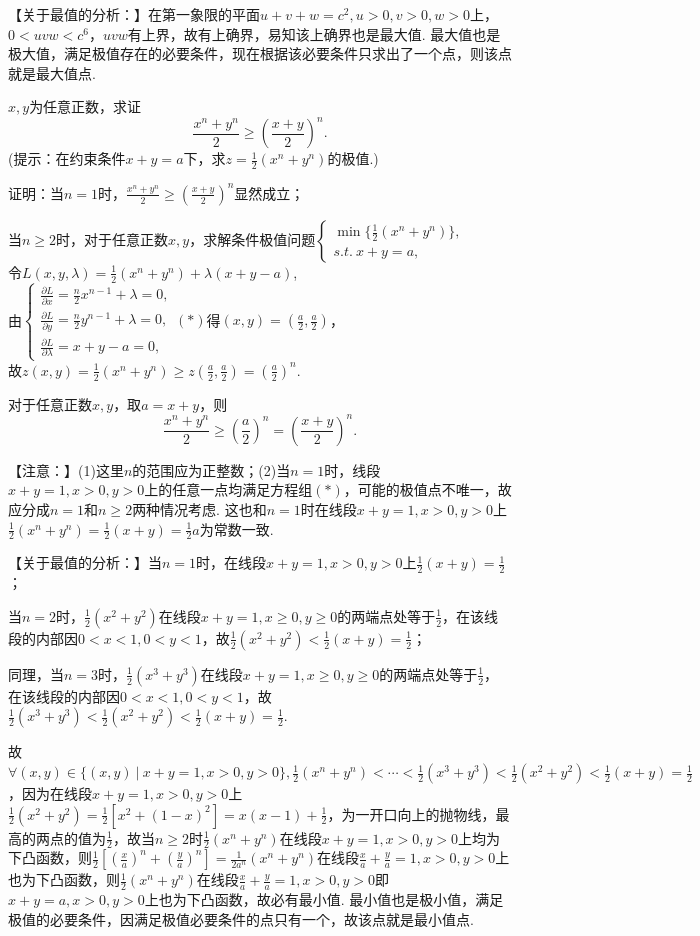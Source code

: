 \documentclass[12pt,UTF8]{ctexart}
\newcommand\Set[2]{\{#1\ \vert\ #2 \}}
\begin{document}
\begin{enumerate}
【关于最值的分析：】在第一象限的平面$u+v+w=c^2,u>0,v>0,w>0$上，$0<uvw<c^6$，$uvw$有上界，故有上确界，易知该上确界也是最大值. 最大值也是极大值，满足极值存在的必要条件，现在根据该必要条件只求出了一个点，则该点就是最大值点.

$x,y$为任意正数，求证
\[\frac{x^n+y^n}2\geqslant(\frac{x+y}2)^n.\]
(提示：在约束条件$x+y=a$下，求$z=\frac12(x^n+y^n)$的极值.)

证明：当$n=1$时，$\frac{x^n+y^n}2\geqslant(\frac{x+y}2)^n$显然成立；

当$n\geqslant2$时，对于任意正数$x,y$，求解条件极值问题$\begin{cases}
\min\{\frac12(x^n+y^n)\},\\
s.t.\ x+y=a,
\end{cases}$\\
令$L(x,y,\lambda)=\frac12(x^n+y^n)+\lambda(x+y-a)$,\\
由$\begin{cases}
\frac{\partial L}{\partial x}=\frac n2x^{n-1}+\lambda=0,\\
\frac{\partial L}{\partial y}=\frac n2y^{n-1}+\lambda=0,\\
\frac{\partial L}{\partial\lambda}=x+y-a=0,
\end{cases}(*)$得$(x,y)=(\frac a2,\frac a2)$，\\
故$z(x,y)=\frac12(x^n+y^n)\geqslant z(\frac a2,\frac a2)=(\frac a2)^n$.

对于任意正数$x,y$，取$a=x+y$，则
\[
\frac{x^n+y^n}2\geqslant(\frac a2)^n=(\frac{x+y}2)^n.
\]

【注意：】(1)这里$n$的范围应为正整数；(2)当$n=1$时，线段$x+y=1,x>0,y>0$上的任意一点均满足方程组$(*)$，可能的极值点不唯一，故应分成$n=1$和$n\geqslant2$两种情况考虑. 这也和$n=1$时在线段$x+y=1,x>0,y>0$上$\frac12(x^n+y^n)=\frac12(x+y)=\frac12a$为常数一致.

【关于最值的分析：】当$n=1$时，在线段$x+y=1,x>0,y>0$上$\frac12(x+y)=\frac 12$；

当$n=2$时，$\frac12(x^2+y^2)$在线段$x+y=1,x\geqslant0,y\geqslant0$的两端点处等于$\frac12$，在该线段的内部因$0<x<1,0<y<1$，故$\frac12(x^2+y^2)<\frac12(x+y)=\frac12$；

同理，当$n=3$时，$\frac12(x^3+y^3)$在线段$x+y=1,x\geqslant0,y\geqslant0$的两端点处等于$\frac12$，在该线段的内部因$0<x<1,0<y<1$，故$\frac12(x^3+y^3)<\frac12(x^2+y^2)<\frac12(x+y)=\frac12$.

故$\forall(x,y)\in\Set{(x,y)}{x+y=1,x>0,y>0},\frac12(x^n+y^n)<\cdots<\frac12(x^3+y^3)<\frac12(x^2+y^2)<\frac12(x+y)=\frac12$，因为在线段$x+y=1,x>0,y>0$上$\frac12(x^2+y^2)=\frac12[x^2+(1-x)^2]=x(x-1)+\frac12$，为一开口向上的抛物线，最高的两点的值为$\frac12$，故当$n\geqslant2$时$\frac12(x^n+y^n)$在线段$x+y=1,x>0,y>0$上均为下凸函数，则$\frac12[(\frac xa)^n+(\frac ya)^n]=\frac1{2a^n}(x^n+y^n)$在线段$\frac xa+\frac ya=1,x>0,y>0$上也为下凸函数，则$\frac12(x^n+y^n)$在线段$\frac xa+\frac ya=1,x>0,y>0$即$x+y=a,x>0,y>0$上也为下凸函数，故必有最小值. 最小值也是极小值，满足极值的必要条件，因满足极值必要条件的点只有一个，故该点就是最小值点.


\end{enumerate}
\end{document}
